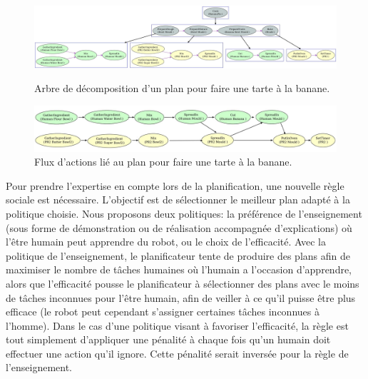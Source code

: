 \documentclass[a4paper,11pt,twoside]{StyleThese}
\begin{document}
 
\clearpage

\begin{figure}
 \centering
  \includegraphics[width=1.0\textwidth]{img/bananaPieMulti.jpg}
    \caption{Arbre de décomposition d'un plan pour faire une tarte à la banane.}
  \label{fig:TreeBanana}
  \includegraphics[width=1.0\textwidth]{img/bananaPieStream.jpg}
    \caption{Flux d'actions lié au plan pour faire une tarte à la banane.}
  \label{fig:StreamBanana}
\end{figure}


\clearpage
 
 
Pour prendre l'expertise en compte lors de la planification, une nouvelle règle sociale est nécessaire. L'objectif est de sélectionner le meilleur plan adapté à la politique choisie. Nous proposons deux politiques: la préférence de l'enseignement (sous forme de démonstration ou de réalisation accompagnée d'explications) où l'être humain peut apprendre du robot, ou le choix de l'efficacité. Avec la politique de l'enseignement, le planificateur tente de produire des plans afin de maximiser le nombre de tâches humaines où l'humain a l'occasion d'apprendre, alors que l'efficacité pousse le planificateur à sélectionner des plans avec le moins de tâches inconnues pour l'être humain, afin de veiller à ce qu'il puisse être plus efficace (le robot peut cependant s'assigner certaines tâches inconnues à l'homme).
Dans le cas d'une politique visant à favoriser l'efficacité, la règle est tout simplement d'appliquer une pénalité à chaque fois qu'un humain doit effectuer une action qu'il ignore. Cette pénalité serait inversée pour la règle de l'enseignement.
\end{document}
